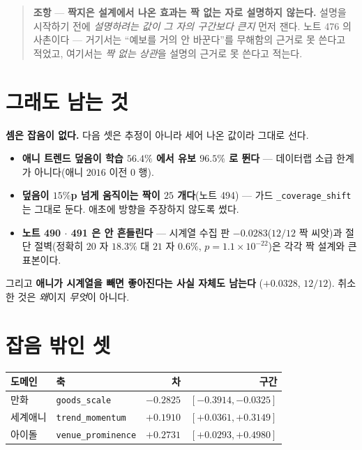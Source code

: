 \documentclass[11pt]{article}
\begin{document}
\begin{quote}
\textbf{조항} --- \textbf{짝지은 설계에서 나온 효과는 짝 없는 자로
설명하지 않는다.} 설명을 시작하기 전에 \emph{설명하려는 값이 그 자의
구간보다 큰지} 먼저 잰다. 노트 476 의 사촌이다 --- 거기서는 ``예보를 거의
안 바꾼다''를 무해함의 근거로 못 쓴다고 적었고, 여기서는 \emph{짝 없는
상관}을 설명의 근거로 못 쓴다고 적는다.
\end{quote}

\section{그래도 남는 것}

\textbf{셈은 잡음이 없다.} 다음 셋은 추정이 아니라 세어 나온 값이라 그대로
선다.

\begin{itemize}
\item \textbf{애니 트렌드 덮음이 학습 $56.4\%$ 에서 유보 $96.5\%$ 로
뛴다} --- 데이터랩 소급 한계가 아니다(애니 $2016$ 이전 $0$ 행).
\item \textbf{덮음이 $15\%$p 넘게 움직이는 짝이 $25$ 개다}(노트 494) ---
가드 \texttt{\_coverage\_shift} 는 그대로 둔다. 애초에 방향을 주장하지
않도록 썼다.
\item \textbf{노트 490 $\cdot$ 491 은 안 흔들린다} --- 시계열 수집 판
$-0.0283$($12/12$ 짝 씨앗)과 절단 절벽(정확히 $20$ 자 $18.3\%$ 대 $21$ 자
$0.6\%$, $p = 1.1 \times 10^{-22}$)은 각각 짝 설계와 큰 표본이다.
\end{itemize}

그리고 \textbf{애니가 시계열을 빼면 좋아진다는 사실 자체도 남는다}
($+0.0328$, $12/12$). 취소한 것은 \emph{왜}이지 \emph{무엇}이 아니다.

\section{잡음 밖인 셋}

\begin{center}
\begin{tabular}{llrr}
\hline
도메인 & 축 & 차 & 구간 \\
\hline
만화 & \texttt{goods\_scale} & $-0.2825$ & $[-0.3914, -0.0325]$ \\
세계애니 & \texttt{trend\_momentum} & $+0.1910$ & $[+0.0361, +0.3149]$ \\
아이돌 & \texttt{venue\_prominence} & $+0.2731$ & $[+0.0293, +0.4980]$ \\
\hline
\end{tabular}
\end{center}
\end{document}
